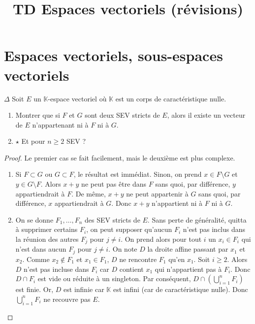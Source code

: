\documentclass[french,a4paper]{article}
\title{TD Espaces vectoriels (révisions)}
\newcommand{\K}{\mathbb{K}}
\theoremstyle{plain}
\theoremstyle{definition}
\theoremstyle{remark}
\begin{document}
\maketitle

\section{Espaces vectoriels, sous-espaces vectoriels}

\begin{ex}[Moulin.EV.01]{$\Delta$}
	Soit $E$ un $\K$-espace vectoriel où $\K$ est un corps de caractéristique nulle.
	\begin{enumerate}
		\item Montrer que si $F$ et $G$ sont deux SEV stricts de $E$, alors il existe un vecteur de $E$ n'appartenant ni à $F$ ni à $G$.
		\item $\star$ Et pour $n\geqslant 2$ SEV ?
	\end{enumerate}
\end{ex}
\begin{proof}
	Le premier cas se fait facilement, mais le deuxième est plus complexe.
	\begin{enumerate}
		\item Si $F\subset G$ ou $G\subset F$, le résultat est immédiat. Sinon, on prend $x\in F\setminus G$ et $y\in G\setminus F$. Alors $x+y$ ne peut pas être dans $F$ sans quoi, par différence, $y$ appartiendrait à $F$. De même, $x+y$ ne peut appartenir à $G$ sans quoi, par différence, $x$ appartiendrait à $G$. Donc $x+y$ n'appartient ni à $F$ ni à $G$.
		\item On se donne $F_1,\ldots, F_n$ des SEV stricts de $E$. Sans perte de généralité, quitta à supprimer certains $F_i$, on peut supposer qu'aucun $F_i$ n'est pas inclus dans la réunion des autres $F_j$ pour $j\ne i$. On prend alors pour tout $i$ un $x_i\in F_i$ qui n'est dans aucun $F_j$ pour $j\ne i$. On note $D$ la droite affine passant par $x_1$ et $x_2$. Comme $x_2\notin F_1$ et $x_1\in F_1$, $D$ ne rencontre $F_1$ qu'en $x_1$. Soit $i\geqslant 2$. Alors $D$ n'est pas incluse dans $F_i$ car $D$ contient $x_1$ qui n'appartient pas à $F_i$. Donc $D\cap F_i$ est vide ou réduite à un singleton. Par conséquent, $D\displaystyle \cap\left(\bigcup_{i=1}^n F_i\right)$ est finie. Or, $D$ est infinie car $\K$ est infini (car de caractéristique nulle). Donc $\displaystyle\bigcup_{i=1}^nF_i$ ne recouvre pas $E$.
	\end{enumerate}
\end{proof}
\end{document}
